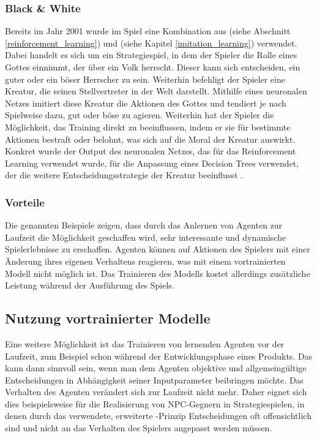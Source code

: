 \subsubsection{Black \& White}
Bereits im Jahr 2001 wurde im Spiel  \cite{black-and-white} eine Kombination aus  (siehe Abschnitt \ref{reinforcement_learning})  und  (siehe Kapitel \ref{imitation_learning}) verwendet. Dabei handelt es sich um ein Strategiespiel, in dem der Spieler die Rolle eines Gottes einnimmt, der über ein Volk herrscht. Dieser kann sich entscheiden, ein guter oder ein böser Herrscher zu sein. Weiterhin befehligt der Spieler eine Kreatur, die seinen Stellvertreter in der Welt darstellt.
Mithilfe eines neuronalen Netzes imitiert diese Kreatur die Aktionen des Gottes und tendiert je nach Spielweise dazu, gut oder böse zu agieren. Weiterhin hat der Spieler die Möglichkeit, das Training direkt zu beeinflussen, indem er sie für bestimmte Aktionen bestraft oder belohnt, was sich auf die Moral der Kreatur auswirkt. Konkret wurde der Output des neuronalen Netzes, das für das Reinforcement Learning verwendet wurde, für die Anpassung eines Decision Trees verwendet, der die weitere Entscheidungsstrategie der Kreatur beeinflusst \cite{black-and-white_2}.

\subsubsection{Vorteile}
Die genannten Beispiele zeigen, dass durch das Anlernen von Agenten zur Laufzeit die Möglichkeit geschaffen wird, sehr interessante und dynamische Spielerlebnisse zu erschaffen. Agenten können auf Aktionen des Spielers mit einer Änderung ihres eigenen Verhaltens reagieren, was mit einem vortrainierten Modell nicht möglich ist. Das Trainieren des Modells kostet allerdings zusätzliche Leistung während der Ausführung des Spiels. 



\subsection{Nutzung vortrainierter Modelle}
Eine weitere Möglichkeit ist das Trainieren von lernenden Agenten vor der Laufzeit, zum Beispiel schon während der Entwicklungsphase eines Produkts. Das kann dann sinnvoll sein, wenn man dem Agenten objektive  und allgemeingültige Entscheidungen in Abhängigkeit seiner Inputparameter beibringen möchte. Das Verhalten des Agenten verändert sich zur Laufzeit nicht mehr. Daher eignet sich dies beispielsweise für die Realisierung von NPC-Gegnern in Strategiespielen, in denen durch das verwendete, erweiterte -Prinzip Entscheidungen oft offensichtlich sind und nicht an das Verhalten des Spielers angepasst werden müssen.


